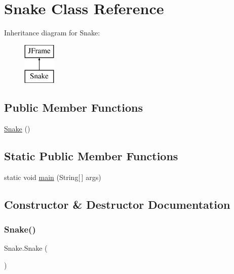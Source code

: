 \hypertarget{class_snake}{}\section{Snake Class Reference}
\label{class_snake}
Inheritance diagram for Snake\+:\begin{figure}[H]
\begin{center}
\leavevmode
\includegraphics[height=2.000000cm]{class_snake}
\end{center}
\end{figure}
\subsection*{Public Member Functions}
\begin{DoxyCompactItemize}
\item 
\hyperlink{class_snake_a35a64028a338e45a72fadb6ce16ec6bd}{Snake} ()
\end{DoxyCompactItemize}
\subsection*{Static Public Member Functions}
\begin{DoxyCompactItemize}
\item 
static void \hyperlink{class_snake_a44187b37496c7c746cf12abdbf85c8cd}{main} (String\mbox{[}$\,$\mbox{]} args)
\end{DoxyCompactItemize}


\subsection{Constructor \& Destructor Documentation}
\mbox{\label{class_snake_a35a64028a338e45a72fadb6ce16ec6bd}} 
\subsubsection{\texorpdfstring{Snake()}{Snake()}}
{\footnotesize\ttfamily Snake.\+Snake (\begin{DoxyParamCaption}{ }\end{DoxyParamCaption})}

